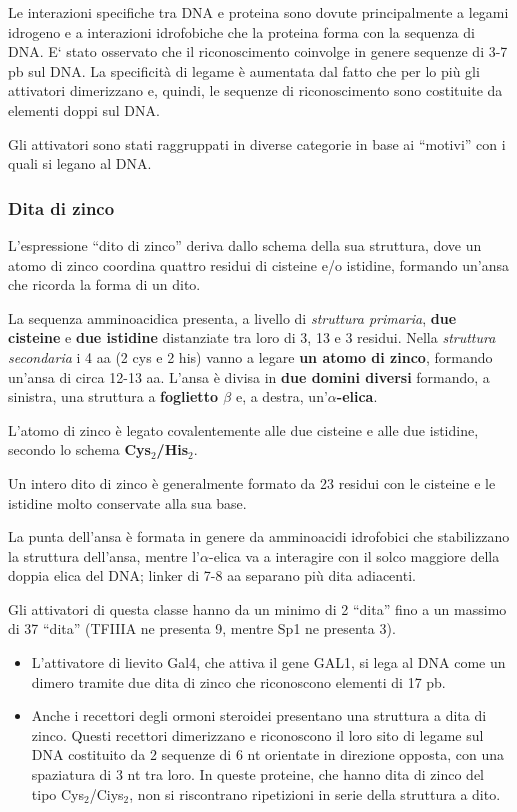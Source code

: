 \documentclass[]{article}
\begin{document}
Le interazioni specifiche tra DNA e proteina sono dovute principalmente
a legami idrogeno e a interazioni idrofobiche che la proteina forma con
la sequenza di DNA. E` stato osservato che il riconoscimento coinvolge
in genere sequenze di 3-7 pb sul DNA. La specificità di legame è
aumentata dal fatto che per lo più gli attivatori dimerizzano e, quindi,
le sequenze di riconoscimento sono costituite da elementi doppi sul DNA.

Gli attivatori sono stati raggruppati in diverse categorie in base ai
``motivi'' con i quali si legano al DNA.

\subsubsection{Dita di zinco}\label{dita-di-zinco}

L'espressione ``dito di zinco'' deriva dallo schema della sua struttura,
dove un atomo di zinco coordina quattro residui di cisteine e/o
istidine, formando un'ansa che ricorda la forma di un dito.

La sequenza amminoacidica presenta, a livello di \emph{struttura
primaria}, \textbf{due cisteine} e \textbf{due istidine} distanziate tra
loro di 3, 13 e 3 residui. Nella \emph{struttura secondaria} i 4 aa (2
cys e 2 his) vanno a legare \textbf{un atomo di zinco}, formando un'ansa
di circa 12-13 aa. L'ansa è divisa in \textbf{due domini diversi}
formando, a sinistra, una struttura a \textbf{foglietto \(\beta\)} e, a
destra, un'\textbf{\(\alpha\)-elica}.

L'atomo di zinco è legato covalentemente alle due cisteine e alle due
istidine, secondo lo schema \textbf{Cys\(_2\)/His\(_2\)}.

Un intero dito di zinco è generalmente formato da 23 residui con le
cisteine e le istidine molto conservate alla sua base.

La punta dell'ansa è formata in genere da amminoacidi idrofobici che
stabilizzano la struttura dell'ansa, mentre l'\(\alpha\)-elica va a
interagire con il solco maggiore della doppia elica del DNA; linker di
7-8 aa separano più dita adiacenti.

Gli attivatori di questa classe hanno da un minimo di 2 ``dita'' fino a
un massimo di 37 ``dita'' (TFIIIA ne presenta 9, mentre Sp1 ne presenta
3).

\begin{itemize}
\item
  L'attivatore di lievito Gal4, che attiva il gene GAL1, si lega al DNA
  come un dimero tramite due dita di zinco che riconoscono elementi di
  17 pb.
\item
  Anche i recettori degli ormoni steroidei presentano una struttura a
  dita di zinco. Questi recettori dimerizzano e riconoscono il loro sito
  di legame sul DNA costituito da 2 sequenze di 6 nt orientate in
  direzione opposta, con una spaziatura di 3 nt tra loro. In queste
  proteine, che hanno dita di zinco del tipo Cys\(_2\)/Ciys\(_2\), non
  si riscontrano ripetizioni in serie della struttura a dito.
\end{itemize}
\end{document}
